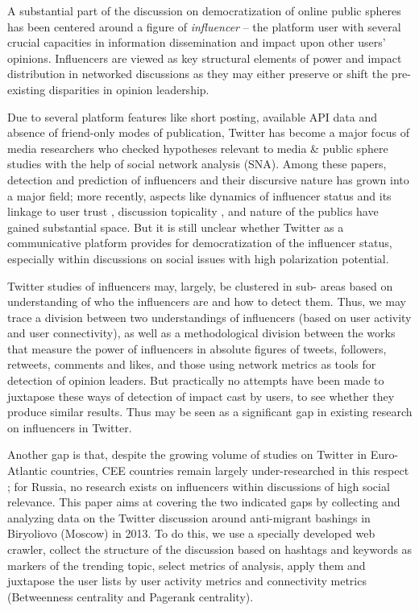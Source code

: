 A substantial part of the discussion on democratization of online public spheres has been centered around a figure of \textit{influencer} \cite{PattersonGrennyMaxfield} -- the platform user with several crucial capacities in information dissemination and impact upon other users’ opinions. Influencers are viewed as key structural elements of power and impact distribution in networked discussions \cite{Castells2007,Castells2009,BakshyHofmanMason} as they may either preserve or shift the pre-existing disparities in opinion leadership.

Due to several platform features like short posting, available API data and absence of friend-only modes of publication, Twitter has become a major focus of media researchers who checked hypotheses relevant to media \& public sphere studies with the help of social network analysis (SNA). Among these papers, detection and prediction of influencers and their discursive nature has grown into a major field; more recently, aspects like dynamics of influencer status and its linkage to user trust \cite{LiuJiangLin}, discussion topicality \cite{KellyBarashAlexanyan}, and nature of the publics \cite{Habermas,Dahlgren,BrunsBurgess,BrunsHighfeld2016,Papacharissi} have gained substantial space. But it is still unclear whether Twitter as a communicative platform provides for democratization of the influencer status, especially within discussions on social issues with high polarization potential.

Twitter studies of influencers may, largely, be clustered in sub- areas based on understanding of who the influencers are and how to detect them. Thus, we may trace a division between two understandings of influencers (based on user activity and user connectivity), as well as a methodological division between the works that measure the power of influencers in absolute figures of tweets, followers, retweets, comments and likes, and those using network metrics as tools for detection of opinion leaders. But practically no attempts have been made to juxtapose these ways of detection of impact cast by users, to see whether they produce similar results. Thus may be seen as a significant gap in existing research on influencers in Twitter.

Another gap is that, despite the growing volume of studies on Twitter in Euro-Atlantic countries, CEE countries remain largely under-researched in this respect \cite{HladikStetka}; for Russia, no research exists on influencers within discussions of high social relevance. This paper aims at covering the two indicated gaps by collecting and analyzing data on the Twitter discussion around anti-migrant bashings in Biryoliovo (Moscow) in 2013. To do this, we use a specially developed web crawler, collect the structure of the discussion based on hashtags and keywords as markers of the trending topic, select metrics of analysis, apply them and juxtapose the user lists by user activity metrics and connectivity metrics (Betweenness centrality and Pagerank centrality).

